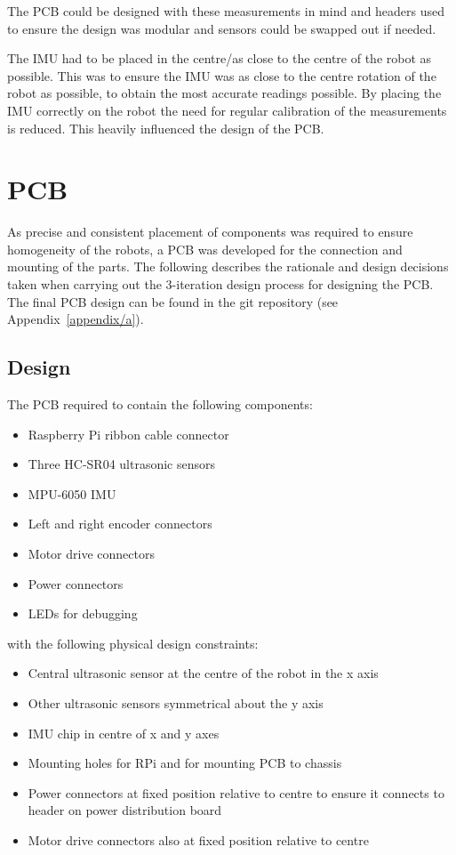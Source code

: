 The PCB could be designed with these measurements 
in mind and headers used to ensure the design 
was modular and sensors could be swapped out if needed. 

The IMU had to be placed in the centre/as 
close to the centre of the robot as possible. This was to ensure the 
IMU was as close to the centre rotation of the robot as possible, to 
obtain the most accurate readings possible. By placing the IMU correctly 
on the robot the need for regular calibration of the measurements is 
reduced. This heavily influenced the design of the PCB. 


\section{PCB}\label{elec/pcb}
As precise and consistent placement of components was required to ensure
homogeneity of the robots, a PCB was developed for the connection
and mounting of the parts. The following
describes the rationale and design decisions taken when carrying out the
3-iteration design process for designing the PCB. The final PCB design can
be found in the git repository (see Appendix~\ref{appendix/a}).

\subsection{Design}\label{elec/pcb/design}
The PCB required to contain the following components:
\begin{itemize}
  \item Raspberry Pi ribbon cable connector
  \item Three HC-SR04 ultrasonic sensors
  \item MPU-6050 IMU
  \item Left and right encoder connectors
  \item Motor drive connectors
  \item Power connectors
  \item LEDs for debugging
\end{itemize}

with the following physical design constraints:

\begin{itemize}
  \item Central ultrasonic sensor at the centre of the robot in the x axis
  \item Other ultrasonic sensors symmetrical about the y axis
  \item IMU chip in centre of x and y axes
  \item Mounting holes for RPi and for mounting PCB to chassis
  \item Power connectors at fixed position relative to centre to ensure it
  connects to header on power distribution board
  \item Motor drive connectors also at fixed position relative to centre
\end{itemize}

